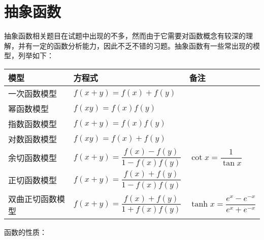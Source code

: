 \section{抽象函数}
抽象函数相关题目在试题中出现的不多，然而由于它需要对函数概念有较深的理解，并有一定的函数分析能力，因此不乏不错的习题。抽象函数有一些常出现的模型，列举如下：
\begin{center}
	\begin{tabular}{lll}
		\hline
		模型&方程式&备注\\
		\hline
		一次函数模型&$f(x+y)=f(x)+f(y)$&\\
		幂函数模型&$f(xy)=f(x)f(y)$&\\
		指数函数模型&$f(x+y)=f(x)f(y)$&\\
		对数函数模型&$f(xy)=f(x)+f(y)$&\\[0.25em]
		余切函数模型&$f(x+y)=\dfrac{f(x)-f(y)}{1-f(x)f(y)}$&$\cot x=\dfrac{1}{\tan x}$\\[1em]
		正切函数模型&$f(x+y)=\dfrac{f(x)+f(y)}{1-f(x)f(y)}$&\\[1em]
		双曲正切函数模型&$f(x+y)=\dfrac{f(x)+f(y)}{1+f(x)f(y)}$&$\tanh x=\dfrac{e^x-e^{-x}}{e^x+e^{-x}}$\\[1em]
		\hline
	\end{tabular} 
\end{center}
函数的性质：
